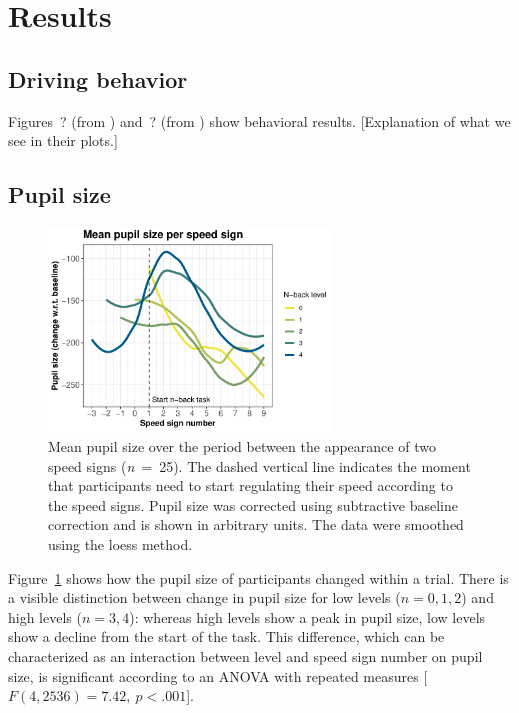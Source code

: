 
\section{Results}\label{sec:results}
\subsection{Driving behavior}
Figures~? (from \citet{DeMooij2021}) and~? (from \citet{Kelapanda2021}) show behavioral results.
[Explanation of what we see in their plots.]

\subsection{Pupil size}
\begin{figure}
  \centering
  \includegraphics[width=7.5cm]{images/speed_sign_nback.pdf}
  \caption{Mean pupil size over the period between the appearance of two speed signs (\textit{n}\ =\ 25).
  The dashed vertical line indicates the moment that participants need to start regulating their speed according to the speed signs.
  Pupil size was corrected using subtractive baseline correction and is shown in arbitrary units. 
  The data were smoothed using the loess method.}
  \label{fig:ps-speed-sign}
\end{figure}

Figure~\ref{fig:ps-speed-sign} shows how the pupil size of participants changed within a trial.
There is a visible distinction between change in pupil size for low \nback levels (\(n = 0,1,2\)) and high \nback levels (\(n = 3,4\)):
whereas high \nback levels show a peak in pupil size, low \nback levels show a decline from the start of the task.
This difference, which can be characterized as an interaction between \nback level and speed sign number on pupil size, is significant according to an ANOVA with repeated measures [\(F(4,2536)=7.42,\ p < .001\)].

